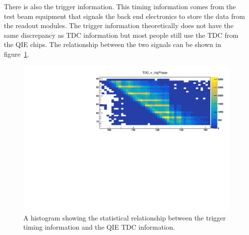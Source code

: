 There is also the trigger information. This timing information comes from the test beam equipment that signals the back end electronics to store the data from the readout modules. The trigger information theoretically does not have the same discrepancy as TDC information but most people still use the TDC from the QIE chips. The relationship between the two signals can be shown in figure~\ref{fig:tdc}.

\begin{figure}
\centering
\includegraphics[width=\linewidth]{Figures/zoom.pdf}
\caption{A histogram showing the statistical relationship between the trigger timing information and the QIE TDC information.}
\label{fig:tdc}
\end{figure}


